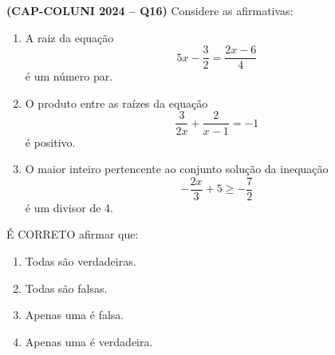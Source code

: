 \textbf{(CAP-COLUNI 2024 -- Q16)} Considere as afirmativas:

\begin{enumerate}[label=\Roman*.]
\item A raiz da equação
\[
5x-\frac32=\frac{2x-6}{4}
\]
é um número par.

\item O produto entre as raízes da equação
\[
\frac{3}{2x}+\frac{2}{x-1}=-1
\]
é positivo.

\item O maior inteiro pertencente ao conjunto solução da inequação
\[
-\frac{2x}{3}+5\geq-\frac72
\]
é um divisor de 4.
\end{enumerate}

É CORRETO afirmar que:

\begin{enumerate}
	\item Todas são verdadeiras.
	\item Todas são falsas.
	\item Apenas uma é falsa.
	\item Apenas uma é verdadeira.
\end{enumerate}
